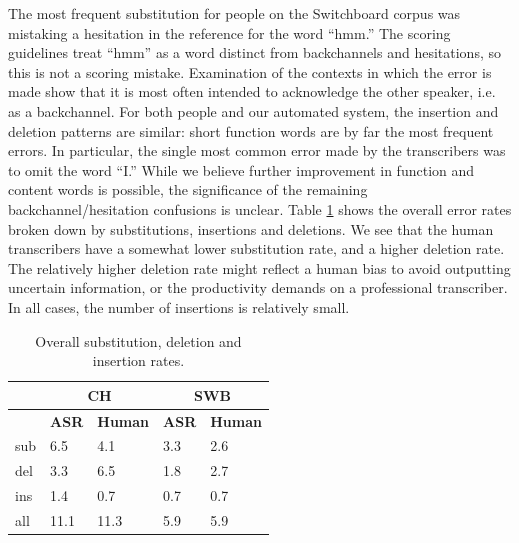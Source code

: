 \documentclass{article}
\begin{document}
The most frequent
substitution 
for people on the Switchboard corpus was mistaking  a hesitation in the
reference for the word ``hmm.'' 
The scoring guidelines treat ``hmm''
as a word distinct from backchannels and hesitations, so this is not
a scoring mistake. Examination of the contexts in which the error is made 
show that it is most often intended to acknowledge the other speaker,
i.e. as a backchannel. For both people and our automated system, the
insertion and deletion patterns are similar: short function words are
by far the most frequent errors. 
In particular, the single most common error made by the transcribers
was to omit the word ``I.''
While we believe further improvement in 
function and content words is possible, the significance of the
remaining backchannel/hesitation confusions is unclear.
Table \ref{tab:dtl} shows the overall error rates broken down by 
substitutions, insertions and deletions. We see that the human transcribers
have a somewhat lower substitution rate, and a higher deletion rate. The
relatively higher deletion rate might reflect a human bias to avoid 
outputting uncertain information, or the productivity demands on a 
professional transcriber. In all cases, the number of insertions is 
relatively small.
 
\begin{table}[t]
    \centering
\caption{Overall substitution, deletion and insertion rates.}
\vspace*{0.1in}
\label{tab:dtl}
        \small
    \begin{tabular}{|l|l|l||l|l|}
    \hline
    & \multicolumn{2}{|c||}{{\bf CH}} & \multicolumn{2}{c|}{{\bf SWB}} \\ \hline 
            &         {\bf ASR}   & {\bf Human}   & {\bf ASR}   & {\bf Human}  \\ \hline \hline
sub & 6.5 & 4.1 & 3.3 &  2.6     \\ \hline
del & 3.3 & 6.5 & 1.8 &  2.7     \\ \hline
ins & 1.4 & 0.7 & 0.7 &  0.7     \\ \hline
all & 11.1 & 11.3 & 5.9 & 5.9    \\ \hline
        \end{tabular}
\end{table}
\end{document}
